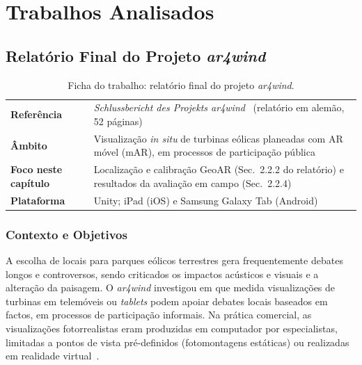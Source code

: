 \section{Trabalhos Analisados}
\label{sec:sota_trabalhos}

\subsection{Relatório Final do Projeto \textit{ar4wind}}
\label{sec:ar4wind}

\begin{table}[htbp]
\centering
\caption{Ficha do trabalho: relatório final do projeto \textit{ar4wind}.}
\label{tab:ficha_ar4wind}
\small
\begin{tabular}{p{3.2cm}p{9.8cm}}
\hline
\textbf{Referência} & \textit{Schlussbericht des Projekts ar4wind}~\cite{ar4wind2023} (relatório em alemão, 52 páginas) \\
\textbf{Âmbito} & Visualização \textit{in situ} de turbinas eólicas planeadas com AR móvel (mAR), em processos de participação pública \\
\textbf{Foco neste capítulo} & Localização e calibração GeoAR (Sec.~2.2.2 do relatório) e resultados da avaliação em campo (Sec.~2.2.4) \\
\textbf{Plataforma} & Unity; iPad (iOS) e Samsung Galaxy Tab (Android) \\
\hline
\end{tabular}
\end{table}

\subsubsection{Contexto e Objetivos}

A escolha de locais para parques eólicos terrestres gera frequentemente debates longos e controversos, sendo criticados os impactos acústicos e visuais e a alteração da paisagem. O \textit{ar4wind} investigou em que medida visualizações de turbinas em telemóveis ou \textit{tablets} podem apoiar debates locais baseados em factos, em processos de participação informais. Na prática comercial, as visualizações fotorrealistas eram produzidas em computador por especialistas, limitadas a pontos de vista pré-definidos (fotomontagens estáticas) ou realizadas em realidade virtual~\cite[Sec.~1.1 e 1.2]{ar4wind2023}.

